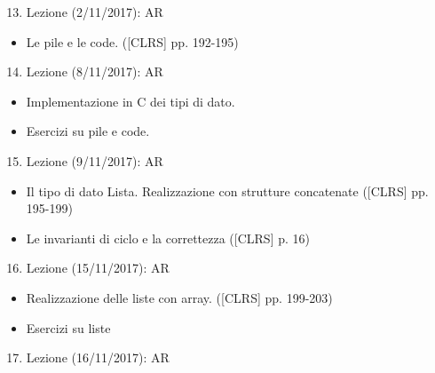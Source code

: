 \documentclass{article}
\providecommand{\tightlist}{%
  \setlength{\itemsep}{0pt}\setlength{\parskip}{0pt}}
\begin{document}
\begin{enumerate}
\setcounter{enumi}{12}
\tightlist
\item
  {Lezione (2/11/2017): AR}
\end{enumerate}

\begin{itemize}
\tightlist
\item
  {Le pile e le code. ({[}CLRS{]} pp. 192-195)}
\end{itemize}

\begin{enumerate}
\setcounter{enumi}{13}
\tightlist
\item
  {Lezione (8/11/2017): AR}
\end{enumerate}

\begin{itemize}
\tightlist
\item
  {Implementazione in C dei tipi di dato.}
\item
  {Esercizi su pile e code.}
\end{itemize}

\begin{enumerate}
\setcounter{enumi}{14}
\tightlist
\item
  {Lezione (9/11/2017): AR}
\end{enumerate}

\begin{itemize}
\tightlist
\item
  {Il tipo di dato Lista. Realizzazione con strutture concatenate
  ({[}CLRS{]} pp. 195-199)}
\item
  {Le invarianti di ciclo e la correttezza ({[}CLRS{]} p. 16)}
\end{itemize}

{}

{}

\begin{enumerate}
\setcounter{enumi}{15}
\tightlist
\item
  {Lezione (15/11/2017): AR}
\end{enumerate}

\begin{itemize}
\tightlist
\item
  {Realizzazione delle liste con array. ({[}CLRS{]} pp. 199-203)}
\item
  {Esercizi su liste}
\end{itemize}

\begin{enumerate}
\setcounter{enumi}{16}
\tightlist
\item
  {Lezione (16/11/2017): AR}
\end{enumerate}
\end{document}
